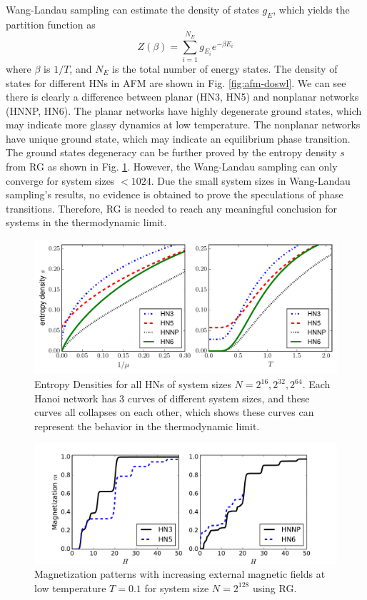 Wang-Landau sampling can estimate the density of states $g_E$, which yields the partition function as 
\begin{equation}
Z(\beta)=\sum_{i=1}^{N_{E}}g_{E_i}e^{-\beta E_i}
\end{equation}
where $\beta$ is $1/T$, and $N_E$ is the total number of energy states. The density of states for different HNs in AFM are shown in Fig. \ref{fig:afm-doswl}. We can see there is clearly a difference between planar (HN3, HN5) and nonplanar networks (HNNP, HN6). The planar networks have highly degenerate ground states, which may indicate more glassy dynamics at low temperature. The nonplanar networks have unique ground state, which may indicate an equilibrium phase transition. The ground states degeneracy can be further proved by the entropy density $s$ from RG as shown in Fig. \ref{fig:afm-entropy}. However, the Wang-Landau sampling can only converge for system sizes $<1024$. Due the small system sizes in Wang-Landau sampling's results, no evidence is obtained to prove the speculations of phase transitions.
Therefore, RG is needed to reach any meaningful conclusion for systems in the thermodynamic limit.

\begin{figure}[h]
\centering \includegraphics[width=0.88\columnwidth]{Chapter-3/HNs_entropy_density.pdf}
\protect\caption{Entropy Densities for all HNs of system sizes $N=2^{16}, 2^{32}, 2^{64}$. Each Hanoi network has 3 curves of different system sizes, and these curves all collapses on each other, which shows these curves can represent the behavior in the thermodynamic limit.  }
\label{fig:afm-entropy} 
\end{figure}

\begin{figure}[h]
\centering \includegraphics[width=0.9\columnwidth]{Chapter-3/HNs_MagvsH_m_vs_H.pdf}
\protect\caption{Magnetization patterns with increasing external magnetic fields at low temperature $T=0.1$ for system size $N=2^{128}$ using RG.}
\label{fig:afm-magplt}
\end{figure}

